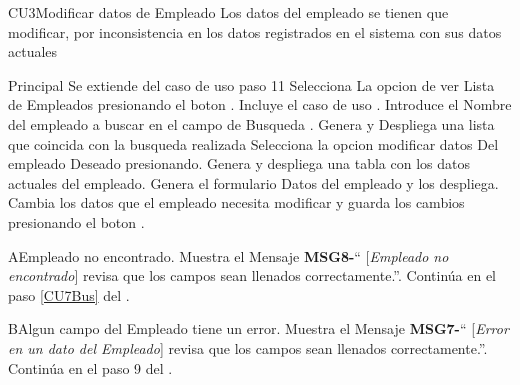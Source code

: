 \begin{UseCase}{CU3}{Modificar datos de  Empleado}{
		Los datos del empleado se tienen que modificar, por inconsistencia en los datos registrados en el sistema con sus datos actuales
	}
	\end{UseCase}
	\begin{UCtrayectoria}{Principal}
		\UCpaso Se extiende del caso de uso  paso 11
		\UCpaso[\UCactor] Selecciona La opcion de ver Lista de  Empleados presionando el boton .
		\UCpaso Incluye el caso de uso .
		\UCpaso[\UCactor] Introduce el Nombre del empleado a buscar en el campo de Busqueda  .
		\UCpaso Genera y Despliega una lista que coincida con la busqueda realizada
		\UCpaso[\UCactor] Selecciona la opcion modificar datos Del empleado Deseado presionando.
		\UCpaso Genera y despliega una tabla con los datos actuales del empleado.
		\UCpaso Genera el formulario Datos del empleado y los despliega.
		\UCpaso[\UCactor] Cambia los datos que el empleado necesita modificar y guarda los cambios presionando el boton  .
	\end{UCtrayectoria}




\begin{UCtrayectoriaA}{A}{Empleado no encontrado.}
			\UCpaso Muestra el Mensaje {\bf MSG8-}`` [{\em Empleado no encontrado}] revisa que los campos sean llenados correctamente.''.
			\UCpaso Continúa en el paso \ref{CU7Bus} del .
		\end{UCtrayectoriaA}


\begin{UCtrayectoriaA}{B}{Algun campo del Empleado tiene un error.}
			\UCpaso Muestra el Mensaje {\bf MSG7-}`` [{\em Error en un dato del Empleado}] revisa que los campos sean llenados correctamente.''.
			\UCpaso Continúa en el paso 9 del .
		\end{UCtrayectoriaA}
